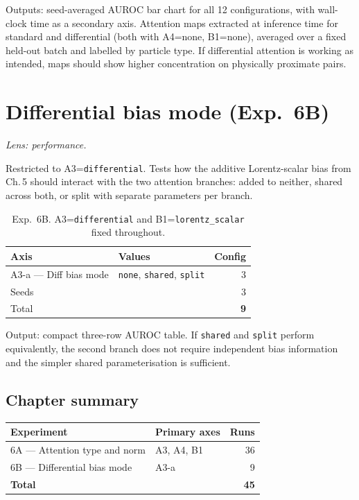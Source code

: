 Outputs: seed-averaged AUROC bar chart for all 12 configurations, with
wall-clock time as a secondary axis. Attention maps extracted at
inference time for standard and differential (both with A4=none,
B1=none), averaged over a fixed held-out batch and labelled by particle
type. If differential attention is working as intended, maps should show
higher concentration on physically proximate pairs.

\section{Differential bias mode (Exp.\ 6B)}
\textit{Lens: performance.}

Restricted to A3=\texttt{differential}. Tests how the additive
Lorentz-scalar bias from Ch.\,5 should interact with the two attention
branches: added to neither, shared across both, or split with separate
parameters per branch.

\begin{table}[h]
\centering\small
\begin{tabular}{llr}
\toprule
Axis & Values & Config \\
\midrule
A3-a — Diff bias mode & \texttt{none}, \texttt{shared}, \texttt{split} & 3 \\
Seeds & & 3 \\
\midrule
Total & & \textbf{9} \\
\bottomrule
\end{tabular}
\caption{Exp.\ 6B. A3=\texttt{differential} and
B1=\texttt{lorentz\_scalar} fixed throughout.}
\end{table}

Output: compact three-row AUROC table. If \texttt{shared} and
\texttt{split} perform equivalently, the second branch does not require
independent bias information and the simpler shared parameterisation
is sufficient.

\subsection*{Chapter summary}

\begin{table}[h]
\centering\small
\begin{tabular}{llr}
\toprule
Experiment & Primary axes & Runs \\
\midrule
6A — Attention type and norm & A3, A4, B1 & 36 \\
6B — Differential bias mode  & A3-a        &  9 \\
\midrule
\textbf{Total} & & \textbf{45} \\
\bottomrule
\end{tabular}
\end{table}
